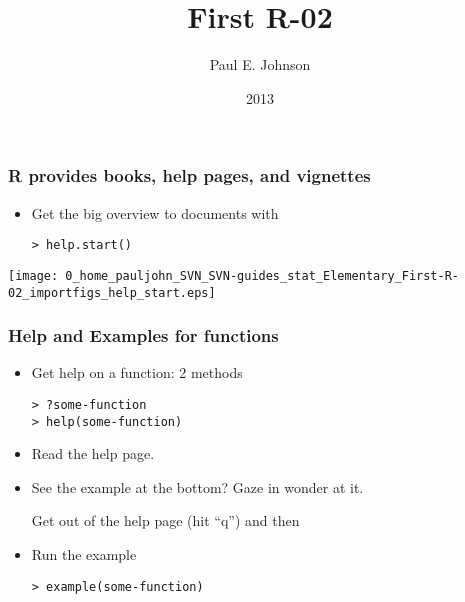 \documentclass[11pt,canadian,english]{beamer}
\def\lyxframeend{} %
\newcommand\makebeamertitle{\frame{\maketitle}}
\begin{document}




%



%


\title[Descriptive]{First R-02 }


\author{Paul E. Johnson \and {}}




\date[2011]{2013}

\makebeamertitle

\lyxframeend{}

\begin{frame}[containsverbatim]
\frametitle{R provides books, help pages, and vignettes}
\begin{itemize}
\item Get the big overview to documents with 


\begin{lstlisting}
> help.start()
\end{lstlisting}


\end{itemize}
\texttt{[image: 0\_home\_pauljohn\_SVN\_SVN-guides\_stat\_Elementary\_First-R-02\_importfigs\_help\_start.eps]}

\end{frame}

\begin{frame}[containsverbatim]
\frametitle{Help and Examples for functions}
\begin{itemize}
\item Get help on a function: 2 methods


\begin{lstlisting}
> ?some-function
> help(some-function)
\end{lstlisting}


\item Read the help page. 
\item See the example at the bottom? Gaze in wonder at it.


Get out of the help page (hit ``q'') and then

\item Run the example


\begin{lstlisting}
> example(some-function)
\end{lstlisting}


\end{itemize}
\end{frame}
\end{document}
